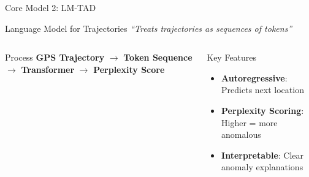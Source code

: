 \documentclass[aspectratio=169,xcolor={dvipsnames}]{beamer}
\begin{document}
\begin{frame}{Core Model 2: LM-TAD \cite{mbuyaTrajectoryAnomalyDetection2024}}
  \begin{block}{Language Model for Trajectories}
    \centering
    \textit{``Treats trajectories as sequences of tokens''}
  \end{block}
  
  \vspace{1em}
  \begin{columns}
    \begin{column}{0.6\textwidth}
      \begin{block}{Process}
        \centering
        \textbf{GPS Trajectory} $\rightarrow$ \textbf{Token Sequence} $\rightarrow$ \textbf{Transformer} $\rightarrow$ \textbf{Perplexity Score}
      \end{block}
    \end{column}
    \begin{column}{0.4\textwidth}
      \begin{block}{Key Features}
        \begin{itemize}
          \item \textbf{Autoregressive}: Predicts next location
          \item \textbf{Perplexity Scoring}: Higher = more anomalous
          \item \textbf{Interpretable}: Clear anomaly explanations
        \end{itemize}
      \end{block}
    \end{column}
  \end{columns}
\end{frame}
\end{document}
